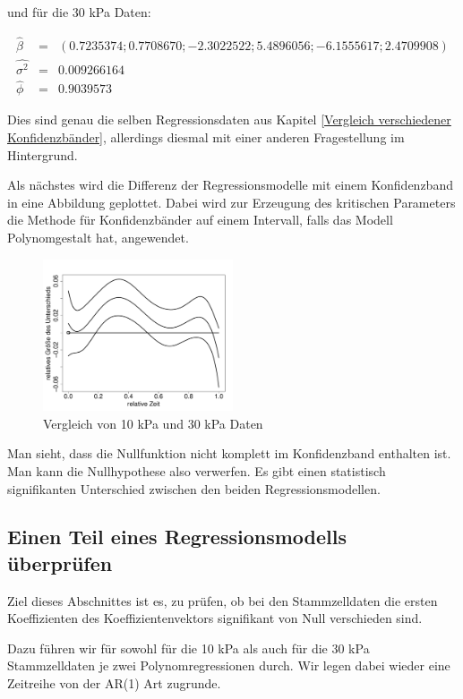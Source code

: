 \documentclass[12pt,a4paper]{article}
\theoremstyle{definition}
\theoremstyle{definition}
\theoremstyle{definition}
\theoremstyle{definition}
\begin{document}
und für die 30 kPa Daten:

\begin{eqnarray*}
\hat{\beta} &=& (0.7235374 ; 0.7708670 ; -2.3022522 ; 5.4896056 ; -6.1555617 ; 2.4709908) \\
\widehat{\sigma^2} &=& 0.009266164 \\
\hat{\phi} &=& 0.9039573
\end{eqnarray*}

Dies sind genau die selben Regressionsdaten aus Kapitel \ref{Vergleich verschiedener Konfidenzbänder}, allerdings diesmal mit einer anderen Fragestellung im Hintergrund.

Als nächstes wird die Differenz der Regressionsmodelle mit einem Konfidenzband in eine Abbildung geplottet. Dabei wird zur Erzeugung des kritischen Parameters die Methode für Konfidenzbänder auf einem Intervall, falls das Modell Polynomgestalt hat, angewendet.

\begin{figure}[H] 
  \centering
     \includegraphics[width=0.5\textwidth]{Vergleich-10vs30kPa-poly5-KB}
  \caption{Vergleich von 10 kPa und 30 kPa Daten}
  \label{fig:10}
\end{figure}

Man sieht, dass die Nullfunktion nicht komplett im Konfidenzband enthalten ist. Man kann die Nullhypothese also verwerfen. Es gibt einen statistisch signifikanten Unterschied zwischen den beiden Regressionsmodellen.


\subsection{Einen Teil eines Regressionsmodells überprüfen}
Ziel dieses Abschnittes ist es, zu prüfen, ob bei den Stammzelldaten die ersten Koeffizienten des Koeffizientenvektors signifikant von Null verschieden sind.

Dazu führen wir für sowohl für die 10 kPa als auch für die 30 kPa Stammzelldaten je zwei Polynomregressionen durch. Wir legen dabei wieder eine Zeitreihe von der AR(1) Art zugrunde.
\end{document}
